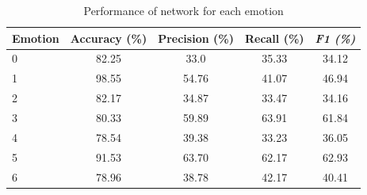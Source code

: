 \documentclass[12pt,twoside]{article}
\begin{document}
\begin{table}[!htbp]
\centering
\begin{tabular}{|l|c|c|c|c|}
\hline
\textbf{Emotion} & \multicolumn{1}{l|}{\textbf{Accuracy (\%)}} & \multicolumn{1}{l|}{\textbf{Precision (\%)}} & \multicolumn{1}{l|}{\textbf{Recall (\%)}} & \multicolumn{1}{l|}{\textit{\textbf{F1 (\%)}}} \\ \hline
0                & 82.25                                       & 33.0                                         & 35.33                                     & 34.12                                          \\ \hline
1                & 98.55                                       & 54.76                                        & 41.07                                     & 46.94                                          \\ \hline
2                & 82.17                                       & 34.87                                        & 33.47                                     & 34.16                                          \\ \hline
3                & 80.33                                       & 59.89                                        & 63.91                                     & 61.84                                          \\ \hline
4                & 78.54                                       & 39.38                                        & 33.23                                     & 36.05                                          \\ \hline
5                & 91.53                                       & 63.70                                        & 62.17                                     & 62.93                                          \\ \hline
6                & 78.96                                       & 38.78                                        & 42.17                                     & 40.41                                          \\ \hline
\end{tabular}
\caption{Performance of network for each emotion}
\label{performance}
\end{table}
\end{document}
